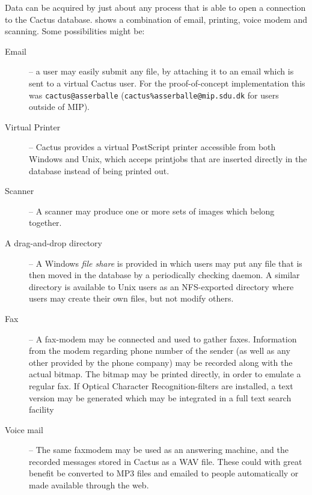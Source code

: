 
Data can be acquired by just about any process that is able
to open a connection to the Cactus database.
 shows a combination of email, printing,
voice modem and scanning.  Some possibilities might be:


\begin{description}
\item[Email] -- a user may easily submit any file, by
  attaching it to an email which is sent to a virtual Cactus
  user.  For the proof-of-concept implementation this was
  \texttt{cactus@asserballe}
  (\texttt{cactus\%asserballe@mip.sdu.dk} for users outside
  of MIP).

\item[Virtual Printer] -- Cactus provides a virtual
  PostScript printer accessible from both Windows and Unix,
  which acceps printjobs that are inserted directly in the
  database instead of being printed out.
  
\item[Scanner] -- A scanner may produce one or more sets of
  images which belong together.
  
\item[A drag-and-drop directory] -- A Windows \textit{file
    share} is provided in which users may put any file that
  is then moved in the database by a periodically checking
  daemon.  A similar directory is available to Unix users as
  an NFS-exported directory where users may create their own
  files, but not modify others.

  
\item[Fax] -- A fax-modem may be connected and used to
  gather faxes.  Information from the modem regarding phone
  number of the sender (as well as any other provided by the
  phone company) may be recorded along with the actual
  bitmap.  The bitmap may be printed directly, in order to
  emulate a regular fax.  If Optical Character
  Recognition-filters are installed, a text version may be
  generated which may be integrated in a full text search
  facility
  
\item[Voice mail] -- The same faxmodem may be used as an
  answering machine, and the recorded messages stored in
  Cactus as a WAV file.  These could with great benefit be
  converted to MP3 files and emailed to people automatically or made available through the web. 

\end{description}

